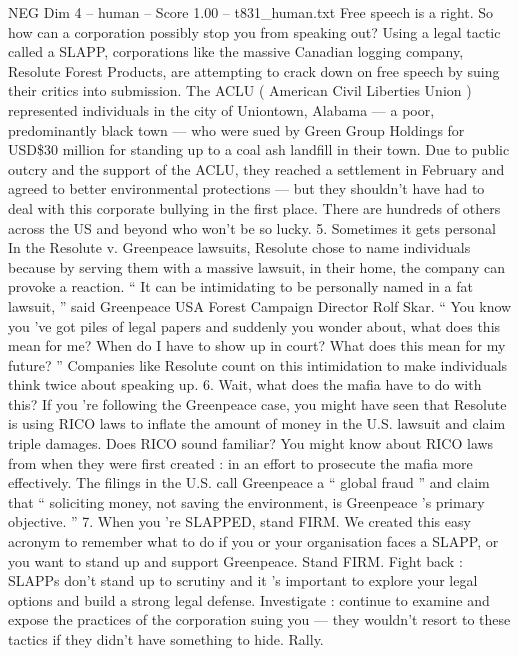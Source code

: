 \begin{textsample}{NEG Dim 4 – human – Score 1.00 – t831\_human.txt}  \label{ex:f4_neg_046}
Free speech is a right.
So how can a corporation possibly stop you from speaking out?
Using a legal tactic called a SLAPP, corporations like the massive Canadian logging company, Resolute Forest Products, are attempting to crack down on free speech by suing their critics into submission.
The ACLU ( American Civil Liberties Union ) represented individuals in the city of Uniontown, Alabama — a poor, predominantly black town — who were sued by Green Group Holdings for USD\$30 million for standing up to a coal ash landfill in their town.
Due to public outcry and the support of the ACLU, they reached a settlement in February and agreed to better environmental protections — but they shouldn't have had to deal with this corporate bullying in the first place.
There are hundreds of others across the US and beyond who won't be so lucky. 5.
Sometimes it gets personal In the Resolute v.
Greenpeace lawsuits, Resolute chose to name individuals because by serving them with a massive lawsuit, in their home, the company can provoke a reaction. “ It can be intimidating to be personally named in a fat lawsuit, ” said Greenpeace USA Forest Campaign Director Rolf Skar. “ You know you ’ve got piles of legal papers and suddenly you wonder about, what does this mean for me?
When do I have to show up in court?
What does this mean for my future? ” Companies like Resolute count on this intimidation to make individuals think twice about speaking up. 6.
Wait, what does the mafia have to do with this?
If you ’re following the Greenpeace case, you might have seen that Resolute is using RICO laws to inflate the amount of money in the U.S. lawsuit and claim triple damages.
Does RICO sound familiar?
You might know about RICO laws from when they were first created : in an effort to prosecute the mafia more effectively.
The filings in the U.S. call Greenpeace a “ global fraud ” and claim that “ soliciting money, not saving the environment, is Greenpeace ’s primary objective. ” 7.
When you ’re SLAPPED, stand FIRM.
We created this easy acronym to remember what to do if you or your organisation faces a SLAPP, or you want to stand up and support Greenpeace.
Stand FIRM.
Fight back : SLAPPs don't stand up to scrutiny and it ’s important to explore your legal options and build a strong legal defense.
Investigate : continue to examine and expose the practices of the corporation suing you — they wouldn't resort to these tactics if they didn't have something to hide.
Rally.

\end{textsample}
